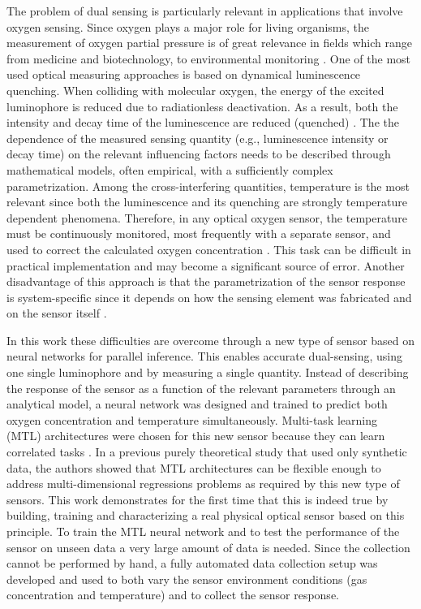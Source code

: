 \documentclass[sensors,article,submit,moreauthors,pdftex,10pt,a4paper]{Definitions/mdpi}
\begin{document}
The problem of dual sensing is particularly relevant in applications that involve oxygen sensing. Since oxygen plays a major role for living organisms, the measurement of oxygen partial pressure is of great relevance in fields which range from medicine and  biotechnology, to environmental monitoring \cite{Papkovsky2013,Wang2014}. One of the most used optical measuring approaches is based on dynamical luminescence quenching. When colliding with molecular oxygen, the energy of the excited luminophore is reduced due to radiationless deactivation. As a result, both the intensity and decay time of the luminescence are reduced (quenched) \cite{Lakowicz2006}. The the dependence of the measured sensing quantity (e.g., luminescence intensity or decay time) on the relevant influencing factors needs to be described through mathematical models, often empirical, with a sufficiently complex parametrization. Among the cross-interfering quantities, temperature is the most relevant since both the luminescence and its quenching are strongly temperature dependent phenomena. Therefore, in any optical oxygen sensor, the temperature must be continuously monitored, most frequently with a separate sensor, and used to correct the calculated oxygen concentration \cite{Li2015}. This task can be difficult in practical implementation and may become a significant source of error. Another disadvantage of this approach is that the parametrization of the sensor response is system-specific since it depends on how the sensing element was fabricated and on the sensor itself \cite{Xu1994,Draxler1995,Hartmann1996,Mills1998,Badocco2008,Dini2011}.

In this work these difficulties are overcome through a new type of sensor  based on neural networks for parallel inference. This enables  accurate dual-sensing, using one single luminophore and by measuring a single quantity.
Instead of describing the response of the sensor as a function of the relevant parameters through an analytical model, a neural network was designed and trained to predict both oxygen concentration and temperature simultaneously.
Multi-task learning (MTL) architectures were chosen for this new sensor because they can learn correlated tasks \cite{Argyriou2006, Thrun1996, Caruana1997, Zhang2017, Baxter2000, Thung2018}. In a previous purely theoretical study that used only synthetic data, the authors showed that MTL architectures can be flexible enough to address multi-dimensional regressions problems \cite{Michelucci2019_2} as required by this new type of sensors. This work demonstrates for the first time that this is indeed true by building, training and characterizing a real physical optical sensor based on this principle.
To train the MTL neural network and to test the performance of the sensor on unseen data a very large amount of data is needed. Since the collection  cannot be performed by hand, a fully automated data collection setup was developed and used to both vary the sensor environment conditions (gas concentration and temperature) and to collect the sensor response. 
\end{document}
